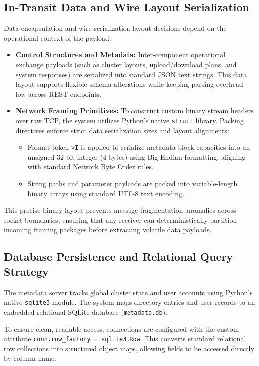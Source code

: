 \subsection{In-Transit Data and Wire Layout Serialization}
Data encapsulation and wire serialization layout decisions depend on the operational context of the payload:
\begin{itemize}
    \item \textbf{Control Structures and Metadata:} Inter-component operational exchange payloads (such as cluster layouts, upload/download plans, and system responses) are serialized into standard JSON text strings. This data layout supports flexible schema alterations while keeping parsing overhead low across REST endpoints.
    \item \textbf{Network Framing Primitives:} To construct custom binary stream headers over raw TCP, the system utilizes Python's native \texttt{struct} library. Packing directives enforce strict data serialization sizes and layout alignments:
    \begin{itemize}
        \item Format token \texttt{>I} is applied to serialize metadata block capacities into an unsigned 32-bit integer (4 bytes) using Big-Endian formatting, aligning with standard Network Byte Order rules.
        \item String paths and parameter payloads are packed into variable-length binary arrays using standard UTF-8 text encoding.
    \end{itemize}
\end{itemize}
This precise binary layout prevents message fragmentation anomalies across socket boundaries, ensuring that any receiver can deterministically partition incoming framing packages before extracting volatile data payloads.

\subsection{Database Persistence and Relational Query Strategy}
The metadata server tracks global cluster state and user accounts using Python's native \texttt{sqlite3} module. The system maps directory entries and user records to an embedded relational SQLite database (\texttt{metadata.db}). 

To ensure clean, readable access, connections are configured with the custom attribute \texttt{conn.row\_factory = sqlite3.Row}. This converts standard relational row collections into structured object maps, allowing fields to be accessed directly by column name. 

